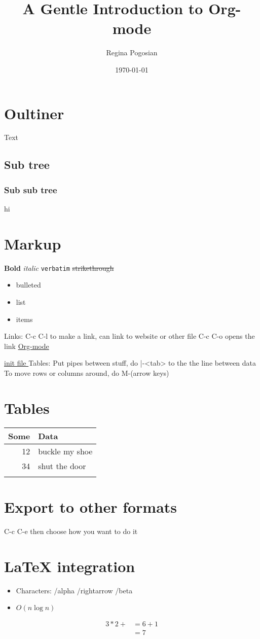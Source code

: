 \documentclass[11pt]{article}
\author{Regina Pogosian}
\date{\today}
\title{A Gentle Introduction to Org-mode}
\begin{document}
\maketitle
\section{Oultiner}
\label{sec:org98c32ac}
Text
\subsection{Sub tree}
\label{sec:org7e4f614}
\subsubsection{Sub sub tree}
\label{sec:org23c9398}
hi
\section{Markup}
\label{sec:org15a849f}
\textbf{Bold} \emph{italic} \texttt{verbatim} \sout{strikethrough}

\begin{itemize}
\item bulleted
\item list
\item items
\end{itemize}

Links: C-c C-l to make a link, can link to website or other file
C-c C-o opens the link
\href{http://orgmode.org/}{Org-mode}

\href{file:///home/regina/.emacs.d/init.el}{init file
}
Tables: Put pipes between stuff, do |-<tab> to the the line between data
To move rows or columns around, do M-(arrow keys)
\section{Tables}
\label{sec:orgac75e87}
\begin{center}
\begin{tabular}{rl}
Some & Data\\
\hline
12 & buckle my shoe\\
34 & shut the door\\
 & \\
\end{tabular}
\end{center}

\section{Export to other formats}
\label{sec:org70610b5}
C-c C-e then choose how you want to do it

\section{\LaTeX{} integration}
\label{sec:org4f14c60}
\begin{itemize}
\item Characters: /alpha /rightarrow /beta
\item \(O(n \log n)\)
\end{itemize}

\begin{align*}
3 * 2 + &= 6 + 1 \\
        &= 7
\end{align*}
\end{document}
